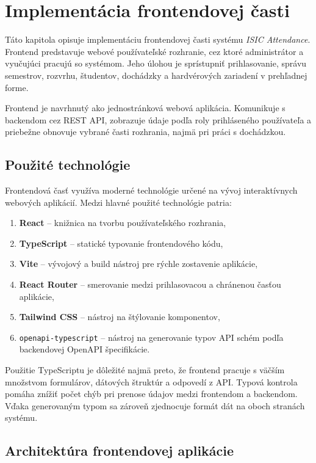 \chapter{Implementácia frontendovej časti}
\label{chap:frontend-implementation}

Táto kapitola opisuje implementáciu frontendovej časti systému \textit{ISIC Attendance}. Frontend predstavuje webové používateľské rozhranie, cez ktoré administrátor a vyučujúci pracujú so systémom. Jeho úlohou je sprístupniť prihlasovanie, správu semestrov, rozvrhu, študentov, dochádzky a hardvérových zariadení v prehľadnej forme.

Frontend je navrhnutý ako jednostránková webová aplikácia. Komunikuje s backendom cez REST API, zobrazuje údaje podľa roly prihláseného používateľa a priebežne obnovuje vybrané časti rozhrania, najmä pri práci s dochádzkou.

\section{Použité technológie}
\label{sec:frontend-technologies}

Frontendová časť využíva moderné technológie určené na vývoj interaktívnych webových aplikácií. Medzi hlavné použité technológie patria:
\begin{enumerate}
    \item \textbf{React} -- knižnica na tvorbu používateľského rozhrania,
    \item \textbf{TypeScript} -- statické typovanie frontendového kódu,
    \item \textbf{Vite} -- vývojový a build nástroj pre rýchle zostavenie aplikácie,
    \item \textbf{React Router} -- smerovanie medzi prihlasovacou a chránenou časťou aplikácie,
    \item \textbf{Tailwind CSS} -- nástroj na štýlovanie komponentov,
    \item \texttt{openapi-typescript} -- nástroj na generovanie typov API schém podľa backendovej OpenAPI špecifikácie.
\end{enumerate}
 
Použitie TypeScriptu je dôležité najmä preto, že frontend pracuje s väčším množstvom formulárov, dátových štruktúr a odpovedí z API. Typová kontrola pomáha znížiť počet chýb pri prenose údajov medzi frontendom a backendom. Vďaka generovaným typom sa zároveň zjednocuje formát dát na oboch stranách systému.
 
\section{Architektúra frontendovej aplikácie}
\label{sec:frontend-architecture}

